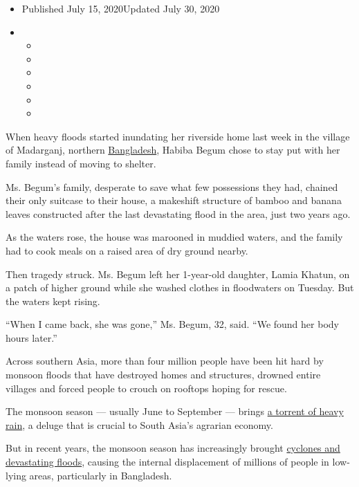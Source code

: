\begin{itemize}
\item
  Published July 15, 2020Updated July 30, 2020
\item
  \begin{itemize}
  \item
  \item
  \item
  \item
  \item
  \item
  \end{itemize}
\end{itemize}

When heavy floods started inundating her riverside home last week in the
village of Madarganj, northern
\href{https://www.nytimes.com/2020/07/30/climate/bangladesh-floods.html}{Bangladesh},
Habiba Begum chose to stay put with her family instead of moving to
shelter.

Ms. Begum's family, desperate to save what few possessions they had,
chained their only suitcase to their house, a makeshift structure of
bamboo and banana leaves constructed after the last devastating flood in
the area, just two years ago.

As the waters rose, the house was marooned in muddied waters, and the
family had to cook meals on a raised area of dry ground nearby.

Then tragedy struck. Ms. Begum left her 1-year-old daughter, Lamia
Khatun, on a patch of higher ground while she washed clothes in
floodwaters on Tuesday. But the waters kept rising.

``When I came back, she was gone,'' Ms. Begum, 32, said. ``We found her
body hours later.''

Across southern Asia, more than four million people have been hit hard
by monsoon floods that have destroyed homes and structures, drowned
entire villages and forced people to crouch on rooftops hoping for
rescue.

The monsoon season --- usually June to September --- brings
\href{https://www.nytimes.com/2019/08/12/world/asia/india-pakistan-monsoons-karachi.html}{a
torrent of heavy rain}, a deluge that is crucial to South Asia's
agrarian economy.

But in recent years, the monsoon season has increasingly brought
\href{https://www.nytimes.com/2019/07/14/world/asia/monsoon-floods-nepal-india.html}{cyclones
and devastating floods}, causing the internal displacement of millions
of people in low-lying areas, particularly in Bangladesh.

